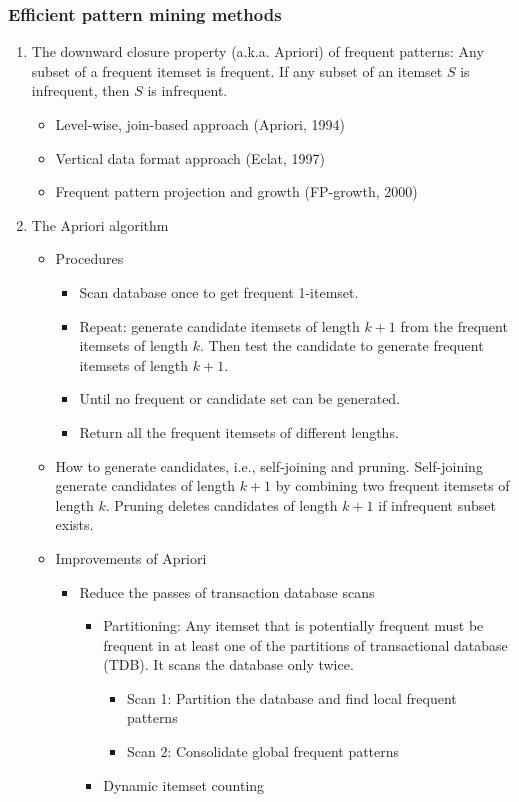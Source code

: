 \documentclass[12pt, a4paper]{article}
\begin{document}
\subsubsection{Efficient pattern mining methods}
\begin{enumerate}
\item The downward closure property (a.k.a. Apriori) of frequent patterns: Any subset of a frequent itemset is frequent. If any subset of an itemset $S$ is infrequent, then $S$ is infrequent.
\begin{itemize}
\item Level-wise, join-based approach (Apriori, 1994)
\item Vertical data format approach (Eclat, 1997)
\item Frequent pattern projection and growth (FP-growth, 2000)
\end{itemize}

\item The Apriori algorithm
\begin{itemize}
\item Procedures 
 \begin{itemize}
   \item Scan database once to get frequent 1-itemset.
   \item Repeat: generate candidate itemsets of length $k+1$ from the frequent itemsets of length $k$. Then test the candidate to generate frequent itemsets of length $k+1$.
   \item Until no frequent or candidate set can be generated.
   \item Return all the frequent itemsets of different lengths.
 \end{itemize}

\item How to generate candidates, i.e., self-joining and pruning. Self-joining generate candidates of length $k+1$ by combining two frequent itemsets of length $k$. Pruning deletes candidates of length $k+1$ if infrequent subset exists.

\item Improvements of Apriori
\begin{itemize}
 \item Reduce the passes of transaction database scans
  \begin{itemize}
   \item Partitioning: Any itemset that is potentially frequent must be frequent in at least one of the partitions of transactional database (TDB). It scans the database only twice.
   \begin{itemize}
    \item Scan 1: Partition the database and find local frequent patterns
    \item Scan 2: Consolidate global frequent patterns
   \end{itemize}
  \item Dynamic itemset counting
 \end{itemize}
 

\end{itemize}
\end{itemize}
\end{enumerate}
\end{document}
